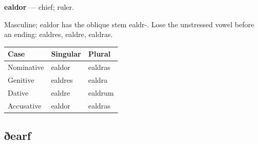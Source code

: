 \par\begin{minipage}{\linewidth}\raggedright
\textbf{ealdor} — chief; ruler.

Masculine; ealdor has the oblique stem ealdr-. Lose the unstressed vowel before an ending: ealdres, ealdre, ealdras.

\par\begingroup
\fontsize{10.5}{13.2}\selectfont
\setlength{\LTleft}{0pt}\setlength{\LTright}{\fill}
\noindent
\begin{tabular}{@{}>{\raggedright\arraybackslash}p{39.46mm}>{\raggedright\arraybackslash}p{39.46mm}>{\raggedright\arraybackslash}p{39.46mm}@{}}
\toprule
\textbf{Case} & \textbf{Singular} & \textbf{Plural} \\
\midrule
Nominative & ealdor & ealdras \\
Genitive & ealdres & ealdra \\
Dative & ealdre & ealdrum \\
Accusative & ealdor & ealdras \\
\bottomrule
\end{tabular}
\par\endgroup

\end{minipage}\par
{}
\subsection*{ðearf}

